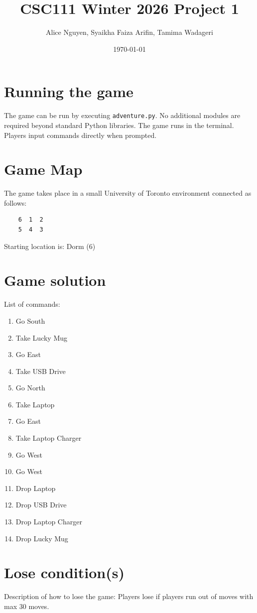 \documentclass[11pt]{article}
\title{CSC111 Winter 2026 Project 1}
\author{Alice Nguyen, Syaikha Faiza Arifin, Tamima Wadageri}
\date{\today}
\begin{document}
\maketitle

\section*{Running the game}
The game can be run by executing \texttt{adventure.py}. No additional modules are required beyond standard Python libraries. The game runs in the terminal. Players input commands directly when prompted.

\section*{Game Map}
The game takes place in a small University of Toronto environment connected as follows:

\begin{verbatim}
    6  1  2
    5  4  3
\end{verbatim}

Starting location is: Dorm (6)

\section*{Game solution}

List of commands:

\begin{enumerate}
    \item Go South
    \item Take Lucky Mug
    \item Go East
    \item Take USB Drive
    \item Go North
    \item Take Laptop
    \item Go East
    \item Take Laptop Charger
    \item Go West
    \item Go West
    \item Drop Laptop
    \item Drop USB Drive
    \item Drop Laptop Charger
    \item Drop Lucky Mug
\end{enumerate}


\section*{Lose condition(s)}
Description of how to lose the game: Players lose if players run out of moves with max 30 moves.\\
\end{document}
